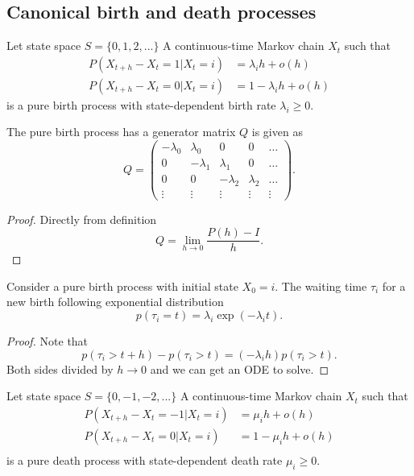 \begin{refsection}
\subsection{Canonical birth and death processes}
\begin{definition}\cite[180]{privault2013understanding} Let state space $S=\{0,1,2,...\}$
A continuous-time Markov chain $X_t$ such that 
\begin{align*}
P(X_{t+h} - X_t = 1| X_t = i) &= \lambda_i h + o(h)\\
P(X_{t+h} - X_t = 0| X_t = i) &= 1 - \lambda_i h + o(h)
\end{align*}
is a pure birth process with state-dependent birth rate $\lambda_i\geq 0$.

\end{definition}

\begin{lemma}
	The pure birth process has a generator matrix $Q$ is given as
	$$Q = \begin{pmatrix}
	-\lambda_0 & \lambda_0 & 0 & 0 & \dots\\ 
	0 & -\lambda_1 & \lambda_1 & 0 & \dots\\ 
	0 & 0 & -\lambda_2 & \lambda_2 & \dots\\ 
	\vdots & \vdots & \vdots & \vdots & \vdots 
	\end{pmatrix}.$$
\end{lemma}
\begin{proof}
Directly from definition $$Q = \lim_{h\to 0}\frac{P(h) - I}{h}.$$
\end{proof}

\begin{lemma}
Consider a pure birth process with initial state $X_0 = i$. The waiting time $\tau_i$ for a new birth following exponential distribution 
$$p(\tau_i = t) = \lambda_i \exp(-\lambda_i t).$$
\end{lemma}
\begin{proof}
Note that $$p(\tau_i > t+h) - p(\tau_i > t)=  (- \lambda_i h)p(\tau_i > t).$$
Both sides divided by $h\to 0$ and we can get an ODE to solve.
\end{proof}


\begin{definition}\cite[180]{privault2013understanding} Let state space $S=\{0,-1,-2,...\}$
	A continuous-time Markov chain $X_t$ such that 
	\begin{align*}
	P(X_{t+h} - X_t = -1| X_t = i) &= \mu_i h + o(h)\\
	P(X_{t+h} - X_t = 0| X_t = i) &= 1 - \mu_i h + o(h)\\
	\end{align*}
	is a pure death process with state-dependent death rate $\mu_i\geq 0$.
\end{definition}



\end{refsection}
